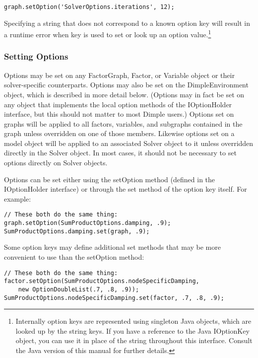 \begin{lstlisting}
graph.setOption('SolverOptions.iterations', 12);
\end{lstlisting}

Specifying a string that does not correspond to a known option key will result in a runtime error when key is used to set or look up an option value.\footnote{Internally option keys are represented using singleton Java objects, which are looked up by the string keys. If you have a reference to the Java IOptionKey object, you can use it in place of the string throughout this interface. Consult the Java version of this manual for further details.}
\fi

\subsubsection{Setting Options}

Options may be set on any FactorGraph, Factor, or Variable object or their solver-specific counterparts. Options may also be set on the DimpleEnvironment object, which is described in more detail below. \ifjava(Options may in fact be set on any object that implements the local option methods of the IOptionHolder interface, but this should not matter to most Dimple users.) \fi Options set on graphs will be applied to all factors, variables, and subgraphs contained in the graph unless overridden on one of those members. Likewise options set on a model object will be applied to an associated Solver object to it unless overridden directly in the Solver object. In most cases, it should not be necessary to set options directly on Solver objects.

\ifjava
Options can be set either using the setOption method (defined in the IOptionHolder interface) or through the set method of the option key itself. For example:

\begin{lstlisting}
// These both do the same thing:
graph.setOption(SumProductOptions.damping, .9);
SumProductOptions.damping.set(graph, .9);
\end{lstlisting}

Some option keys may define additional set methods that may be more convenient to use than the setOption method:

\begin{lstlisting}
// These both do the same thing:
factor.setOption(SumProductOptions.nodeSpecificDamping,
    new OptionDoubleList(.7, .8, .9));
SumProductOptions.nodeSpecificDamping.set(factor, .7, .8, .9);
\end{lstlisting}
\fi


